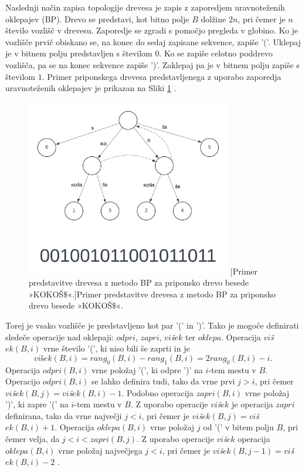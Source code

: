 Naslednji način zapisa topologije drevesa je zapis z zaporedjem uravnoteženih oklepajev (BP). Drevo se predstavi, kot bitno polje $B$ dolžine $2n$, pri čemer je $n$ število vozlišč v drevesu. Zaporedje se zgradi s pomočjo pregleda v globino. Ko je vozlišče prvič obiskano se, na konec do sedaj zapisane sekvence, zapiše '('. Uklepaj je v bitnem polju predstavljen s številom $0$. Ko se zapiše celotno poddrevo vozlišča, pa se na konec sekvence zapiše ')'. Zaklepaj pa je v bitnem polju zapiše s številom $1$. Primer priponskega drevesa predstavljenega z uporabo zaporedja uravnoteženih oklepajev je prikazan na Sliki \ref{fig:BP} \cite{Navarro2016}.

\begin{figure}[htb]
    \begin{center}
        \includegraphics[width=0.8\textwidth]{Slike/KokosSTBP.png}
        [Primer predstavitve drevesa z metodo BP za priponsko drevo besede »KOKOŠ$\$$«.]{Primer predstavitve drevesa z metodo BP za priponsko drevo besede »KOKOŠ$\$$«.} 
        \label{fig:BP}
    \end{center}
\end{figure}

Torej je vsako vozlišče je predstavljeno kot par '(' in ')'. Tako je mogoče definirati sledeče operacije nad oklepaji: $odpri$, $zapri$, $vi$\textit{š}$ek$ ter $oklepa$. Operacija $vi$\textit{š}$ek(B,i)$ vrne število '(', ki niso bili še zaprti in je
$$
    vi\textit{š}ek(B,i)=rang_0(B,i)-rang_1(B,i)=2rang_0(B,i)-i.
$$
Operacija $odpri(B,i)$ vrne položaj '(', ki odpre ')' na $i$-tem mestu v $B$. Operacijo $odpri(B,i)$ se lahko definira tudi, tako da vrne prvi $j>i$, pri čemer $vi$\textit{š}$ek(B,j)=vi$\textit{š}$ek(B,i)-1$. Podobno operacija $zapri(B,i)$  vrne položaj ')', ki zapre '(' na $i$-tem mestu v $B$. Z uporabo operacije $vi$\textit{š}$ek$ je operacija $zapri$ definirana, tako da vrne največji $j<i$, pri čemer je $vi$\textit{š}$ek(B,j)=vi$\textit{š}$ek(B,i)+1$. Operacija $oklepa(B,i)$ vrne položaj $j$ od '(' v bitem polju $B$, pri čemer velja, da $j<i<zapri(B,j)$. Z uporabo operacije $vi$\textit{š}$ek$ operacija $oklepa(B,i)$ vrne položaj največjega $j<i$, pri čemer je $vi$\textit{š}$ek(B,j-1)=vi$\textit{š}$ek(B,i)-2$
 \cite{Navarro2016}.

